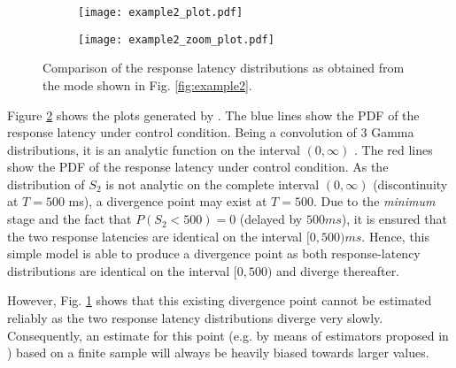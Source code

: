 \begin{figure} [!ht]
 \begin{subfigure}[t]{0.45\textwidth}
   \texttt{[image: example2\_plot.pdf]}
  \end{subfigure} \hfill
 \begin{subfigure}[t]{0.45\textwidth}
   \texttt{[image: example2\_zoom\_plot.pdf]}
    \label{fig:podzoom}
  \end{subfigure}
  \caption{Comparison of the response latency distributions as obtained from the mode shown in Fig. \ref{fig:example2}.}
  \label{fig:podplots}
\end{figure}

Figure \ref{fig:podplots} shows the plots generated by . The blue lines show the PDF
of the response latency under control condition. Being a convolution of 3 Gamma distributions, it 
is an analytic function on the interval $(0,\infty)$ \citep{Gelooven1999}. The red lines show the 
PDF of the response latency under control condition. As the distribution of $S_2$ is not analytic on 
the complete interval $(0,\infty)$ (discontinuity at $T=500$ ms), a divergence point may exist at 
$T=500$. Due to the \emph{minimum} stage and the fact that $P(S_2<500)=0$ (delayed by 
$500 ms$), it is ensured that the two response latencies are identical on the interval $[0,500) ms$.
Hence, this simple model is able to produce a divergence point as both response-latency distributions are identical
on the interval $[0,500)$ and diverge thereafter.

However, Fig. \ref{fig:podzoom} shows that this existing divergence point cannot be estimated reliably as the two 
response latency distributions diverge very slowly. Consequently, an estimate for this point (e.g. by means of 
estimators proposed in \citep{Reingold2012}) based on a finite sample will always be heavily biased towards larger
values.